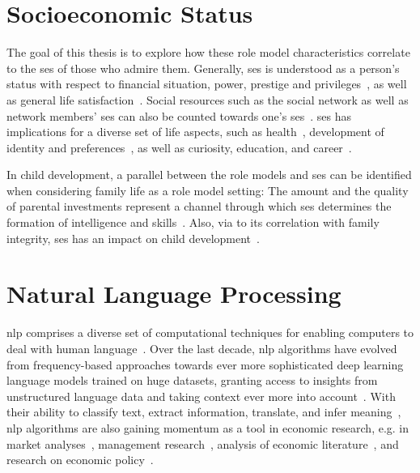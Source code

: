 \section{Socioeconomic Status}
The goal of this thesis is to explore how these role model characteristics correlate to the \gls{ses} of those who admire them. Generally, \gls{ses} is understood as a person's status with respect to financial situation, power, prestige and privileges~\autocite{mueller_measures_1981}, as well as general life satisfaction~\autocite{wagner_german_2007}. Social resources such as the social network as well as network members' \gls{ses} can also be counted towards one's \gls{ses}~\autocite{campbell_social_1986}. \gls{ses} has implications for a diverse set of life aspects, such as health~\autocite{oakes_measurement_2003, braveman_social_2011}, development of identity and preferences~\autocite{bradley_socioeconomic_2002, kraus_social_2012}, as well as curiosity, education, and career~\autocite{broer_review_2019,tucker-drob_socioeconomic_2012,walpole_socioeconomic_2003}.

In child development, a parallel between the role models and \gls{ses} can be identified when considering family life as a role model setting: The amount and the quality of parental investments represent a channel through which \gls{ses} determines the formation of intelligence and skills~\autocite{cunha_technology_2007,falk_socioeconomic_2021,cobb-clark_parenting_2019}. Also, via to its correlation with family integrity, \gls{ses} has an impact on child development~\autocite{conger_socioeconomic_2010}.






\section{Natural Language Processing}
\gls{nlp} comprises a diverse set of computational techniques for enabling computers to deal with human language~\autocite{jurafsky_speech_2008}. Over the last decade, \gls{nlp} algorithms have evolved from frequency-based approaches towards ever more sophisticated deep learning language models trained on huge datasets, granting access to insights from unstructured language data and taking context ever more into account~\autocite{vajjala_practical_2020}. With their ability to classify text, extract information, translate, and infer meaning~\autocite{jurafsky_speech_2008}, \gls{nlp} algorithms are also gaining momentum as a tool in economic research, e.g. in market analyses~\autocite{hoberg_product_2010}, management research~\autocite{kang_natural_2020}, analysis of economic literature~\autocite{kim_keyword_2021,jelveh_detecting_2014,lambert_identifying_2021}, and research on economic policy~\autocite{elshehawy_sascat_2022}.


